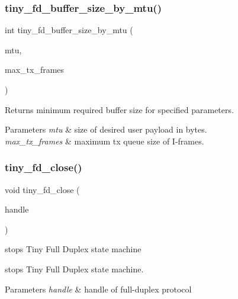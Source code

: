 \subsubsection{\texorpdfstring{tiny\+\_\+fd\+\_\+buffer\+\_\+size\+\_\+by\+\_\+mtu()}{tiny\_fd\_buffer\_size\_by\_mtu()}}
{\footnotesize\ttfamily int tiny\+\_\+fd\+\_\+buffer\+\_\+size\+\_\+by\+\_\+mtu (\begin{DoxyParamCaption}\item[{int}]{mtu,  }\item[{int}]{max\+\_\+tx\+\_\+frames }\end{DoxyParamCaption})}

Returns minimum required buffer size for specified parameters. 
\begin{DoxyParams}{Parameters}
{\em mtu} & size of desired user payload in bytes. \\
\hline
{\em max\+\_\+tx\+\_\+frames} & maximum tx queue size of I-\/frames. \\
\hline
\end{DoxyParams}
\mbox{\label{group__FULL__DUPLEX__API_ga11e470503e3359bc29a5bcb65a9771d5}} 
\subsubsection{\texorpdfstring{tiny\+\_\+fd\+\_\+close()}{tiny\_fd\_close()}}
{\footnotesize\ttfamily void tiny\+\_\+fd\+\_\+close (\begin{DoxyParamCaption}\item[{\hyperlink{group__FULL__DUPLEX__API_ga91e6b79431fe38570fb102701ef0b7e8}{tiny\+\_\+fd\+\_\+handle\+\_\+t}}]{handle }\end{DoxyParamCaption})}



stops Tiny Full Duplex state machine 

stops Tiny Full Duplex state machine.


\begin{DoxyParams}{Parameters}
{\em handle} & handle of full-\/duplex protocol \\
\hline
\end{DoxyParams}
\mbox{\label{group__FULL__DUPLEX__API_ga73c3e76cfbcd7b9bb8e1f7826175774b}} 
